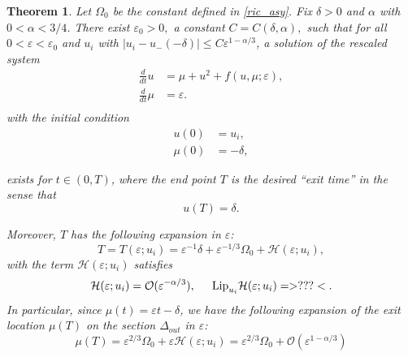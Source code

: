\documentclass[letterpaper,11pt]{article}
\newcommand{\rmO}{\mathcal{O}}
\newcommand{\eps}{\varepsilon}
\numberwithin{equation}{section}
\theoremstyle{plain}
\newtheorem{theorem}{Theorem}[section]
\begin{document}
\begin{theorem}\label{thm:main}Let $\Omega_0$ be the constant defined in \eqref{ric_asy}.
Fix $\delta>0$ and $\alpha$ with $0<\alpha <3/4$. There exist $\eps_0>0,$ a constant $C=C(\delta,\alpha),$ such that for all $0<\eps<\eps_0$ and $u_i$ with $|u_i -u_-(-\delta) | \le C\eps^{1-\alpha/3}$, a solution of the rescaled system 
\begin{equation}\label{main_eqn}
\begin{split}
\frac{d}{dt}u &= \mu+u^2+ f(u,\mu;\eps), \\
\frac{d}{dt} \mu &= \eps.  \\
\end{split}
\end{equation}
with the initial condition
\begin{equation}\label{main_ic}
\begin{split}
u(0) &= u_i, \\
\mu(0) &= -\delta,
\end{split}
\end{equation}

exists for $t \in (0,T)$, where the end point $T$ is the desired ``exit time'' in the sense that 
\begin{equation}\label{exit_time_cond}
 u(T) = \delta.
\end{equation}

Moreover, $T$ has the following expansion in $\eps$:
\begin{equation}\label{T_exp_+}
T = T(\eps ; u_i) = \eps^{-1}\delta + \eps^{-1/3}\Omega_0 +  \mathcal{H}(\eps; u_i),
\end{equation}
with the term $\mathcal{H}(\eps;u_i)$ satisfies 
\begin{equation}\label{T_remainder_exp}
\mathcal{H}(\eps;u_i) = \rmO(\eps^{-\alpha/3}), \hspace{0.2in} \text{Lip}_{u_i}\mathcal{H}(\eps;u_i) = >???<.
\end{equation}
In particular, since $\mu(t) = \eps t -\delta$, we have the following expansion of the exit location $\mu(T)$ on the section $\Delta_{out}$ in $\eps$:
\begin{equation}\label{exit_loc_exp}
\mu(T) = \eps^{2/3}\Omega_0  + \eps\mathcal{H}(\eps; u_i) = \eps^{2/3}\Omega_0 + \rmO(\eps^{1-\alpha/3})
\end{equation}

\end{theorem}
\end{document}
